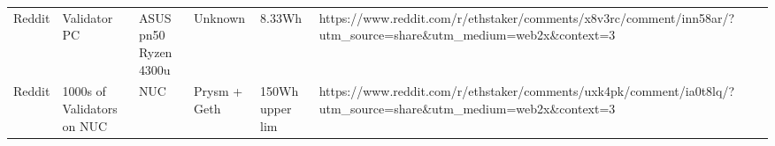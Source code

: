 \begin{landscape}
\begin{table}[]
\begin{tabular}{@{}llllll@{}}
Reddit                                                                               & Validator PC                                                                      & ASUS pn50 Ryzen 4300u                                                                      & Unknown                                                                              & 8.33Wh                                                                                      & https://www.reddit.com/r/ethstaker/comments/x8v3rc/comment/inn58ar/?utm\_source=share\&utm\_medium=web2x\&context=3 \\
Reddit                                                                               & 1000s of Validators on NUC                                                        & NUC                                                                                        & Prysm + Geth                                                                         & 150Wh upper lim                                                                             & https://www.reddit.com/r/ethstaker/comments/uxk4pk/comment/ia0t8lq/?utm\_source=share\&utm\_medium=web2x\&context=3
\end{tabular}
\end{table}
\end{landscape}